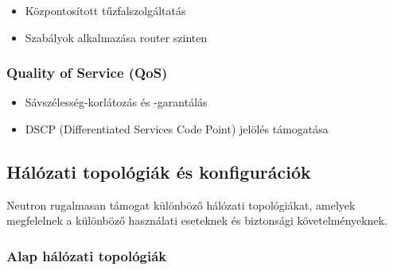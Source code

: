 \documentclass[a4paper,12pt]{article}
\begin{document}
    \begin{itemize}
        \item Központosított tűzfalszolgáltatás
        \item Szabályok alkalmazása router szinten
    \end{itemize}

    \subsubsection{Quality of Service (QoS)}

    \begin{itemize}
        \item Sávszélesség-korlátozás és -garantálás
        \item DSCP (Differentiated Services Code Point) jelölés támogatása
    \end{itemize}

    \subsection{Hálózati topológiák és konfigurációk}

    Neutron rugalmasan támogat különböző hálózati topológiákat, amelyek megfelelnek a különböző használati eseteknek és biztonsági követelményeknek.

    \subsubsection{Alap hálózati topológiák}
\end{document}
